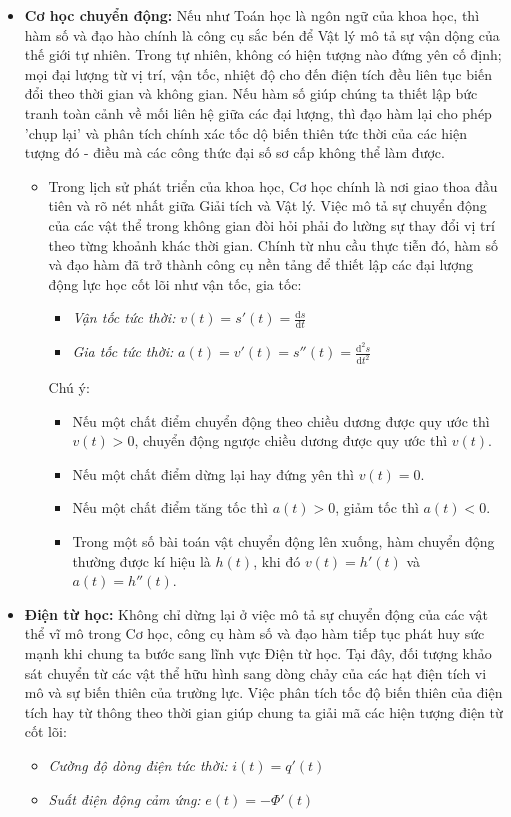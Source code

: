 \documentclass[12pt,a4paper]{article}
\begin{document}
\begin{itemize}
    \item \textbf{Cơ học chuyển động:}
    Nếu như Toán học là ngôn ngữ của khoa học, thì hàm số và đạo hào chính là công cụ sắc bén để Vật lý mô tả sự vận dộng của thế giới tự nhiên. Trong tự nhiên, không có hiện tượng nào đứng yên cố định; mọi đại lượng từ vị trí, vận tốc, nhiệt độ cho đến điện tích đều liên tục biến đổi theo thời gian và không gian. Nếu hàm số giúp chúng ta thiết lập bức tranh toàn cảnh về mối liên hệ giữa các đại lượng, thì đạo hàm lại cho phép 'chụp lại' và phân tích chính xác tốc dộ biến thiên tức thời của các hiện tượng đó - điều mà các công thức đại số sơ cấp không thể làm được.
\begin{itemize}
    \item  Trong lịch sử phát triển của khoa  học, Cơ học chính là nơi giao thoa đầu tiên và rõ nét nhất giữa Giải tích và Vật lý. Việc mô tả sự chuyển động của các vật thể trong không gian đòi hỏi phải đo lường sự thay đổi vị trí theo từng khoảnh khác thời gian. Chính từ nhu cầu thực tiễn đó, hàm số và đạo hàm đã trở  thành công cụ nền tảng để thiết lập các đại lượng động lực học cốt lõi như vận tốc, gia tốc:
    \begin{itemize}
        \item \textit{Vận tốc tức thời:} $v(t) = s'(t) = \frac{\mathrm{d}s}{\mathrm{d}t}$
        \item \textit{Gia tốc tức thời:} $a(t) = v'(t) = s''(t) = \frac{\mathrm{d}^2s}{\mathrm{d}t^2}$
    \end{itemize}
    Chú ý:
    \begin{itemize}
    \item Nếu một chất điểm chuyển động theo chiều dương được quy ước thì $v(t)>0$, chuyển động ngược chiều dương được quy ước thì $v(t)$.
    \item Nếu một chất điểm dừng lại hay đứng yên thì $v(t)=0$.
    \item Nếu một chất điểm tăng tốc thì $a(t)>0$, giảm tốc thì $a(t)<0$.
    \item Trong một số bài toán vật chuyển động lên xuống, hàm chuyển động thường được kí hiệu là $h(t)$, khi đó $v(t)=h'(t)$ và $a(t)=h''(t)$.
    \end{itemize}
    \end{itemize}
    
    \item \textbf{Điện từ học:} Không chỉ dừng lại ở việc mô tả sự chuyển động của các vật thể vĩ mô trong Cơ học, công cụ hàm số và đạo hàm tiếp tục phát huy sức mạnh khi chung ta bước sang lĩnh vực Điện từ học. Tại đây, đối tượng khảo sát chuyển từ các vật thể hữu hình sang dòng chảy của các hạt điện tích vi mô và sự biến thiên của trường lực. Việc phân tích tốc độ biến thiên của điện tích hay từ thông theo thời gian giúp chung ta giải mã các hiện tượng điện từ cốt lõi:
    \begin{itemize}
        \item \textit{Cường độ dòng điện tức thời:} $i(t) = q'(t)$
        \item \textit{Suất điện động cảm ứng:} $e(t) = -\Phi'(t)$
    \end{itemize}
\end{itemize}
\end{document}
